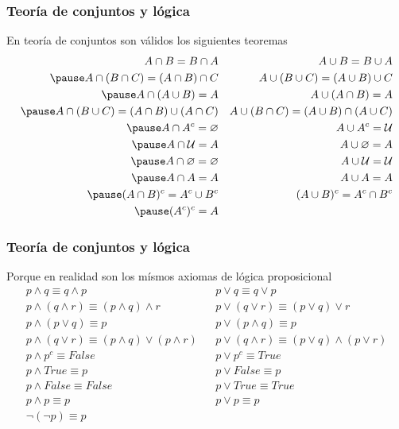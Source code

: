 \documentclass{beamer}
\begin{document}
\begin{frame}[fragile]
    \frametitle{Teoría de conjuntos y lógica}
    En teoría de conjuntos son válidos los siguientes teoremas
    \begin{eqnarray*}
        A \cap B = B \cap A && A \cup B = B \cup A \\
        \pause
        A \cap (B \cap C) = (A \cap B) \cap C && A \cup (B \cup C) = (A \cup B) \cup C \\
        \pause
        A \cap (A \cup B) = A && A \cup (A \cap B) = A \\
        \pause
        A \cap (B \cup C) = (A \cap B) \cup (A \cap C) && A \cup (B \cap C) = (A \cup B) \cap (A \cup C) \\
        \pause
        A \cap A^{c} = \varnothing && A \cup A^{c} = \mathcal{U} \\
        \pause
        A \cap \mathcal{U} = A && A \cup \varnothing = A \\
        \pause
        A \cap \varnothing = \varnothing && A \cup \mathcal{U} = \mathcal{U} \\
        \pause
        A \cap A = A && A \cup A = A \\
        \pause
        (A \cap B)^c = A^c \cup B^c && (A \cup B)^c = A^c \cap B^c \\
        \pause
        (A^c)^c = A \\
    \end{eqnarray*}
\end{frame}

\begin{frame}[fragile]
    \frametitle{Teoría de conjuntos y lógica}
    Porque en realidad son los mísmos axiomas de lógica proposicional
    \begin{eqnarray*}
        p \land q \equiv q \land p && p \lor q \equiv q \lor p \\
        p \land (q \land r) \equiv (p \land q) \land r && p \lor (q \lor r) \equiv (p \lor q) \lor r \\
        p \land (p \lor q) \equiv p && p \lor (p \land q) \equiv p \\
        p \land (q \lor r) \equiv (p \land q) \lor (p \land r) && p \lor (q \land r) \equiv (p \lor q) \land (p \lor r) \\
        p \land p^{c} \equiv False && p \lor p^{c} \equiv True \\
        p \land True \equiv p && p \lor False \equiv p \\
        p \land False \equiv False && p \lor True \equiv True \\
        p \land p \equiv p && p \lor p \equiv p \\
        \lnot (\lnot p) \equiv p \\
    \end{eqnarray*}
\end{frame}
\end{document}
